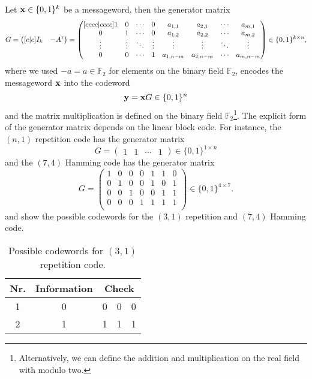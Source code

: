Let $\vb{x}\in\{0,1\}^k$ be a messageword, then the generator matrix
\begin{equation}
	G
	=
	\begin{pmatrix}[c|c]
		I_k & -A^{\scriptscriptstyle\mathsf{T}}
	\end{pmatrix}
	=
	\begin{pmatrix}[cccc|cccc]
		1 & 0 & \cdots & 0 & a_{1,1} & a_{2,1} & \cdots & a_{m,1} \\
		0 & 1 & \cdots & 0 & a_{1,2} & a_{2,2} & \cdots & a_{m,2}\\
		\vdots & \vdots  & \ddots & \vdots & \vdots & \vdots & \ddots & \vdots \\
		0 & 0 & \cdots & 1 & a_{1,n-m} & a_{2,n-m} & \cdots & a_{m,n-m} \\
	\end{pmatrix}
	\in\{0,1\}^{k\times n}
	,
\end{equation}
where we used $-a=a\in\mathbb{F}_2$ for elements on the binary field $\mathbb{F}_2$, encodes the messageword $\vb{x}$ into the codeword
\begin{equation}
	\vb{y}
	=
	\vb{x}G
	\in\{0,1\}^n
\end{equation}
and the matrix multiplication is defined on the binary field $\mathbb{F}_2$\footnote{Alternatively, we can define the addition and multiplication on the real field with modulo two.}.
The explicit form of the generator matrix depends on the linear block code.
For instance, the $(n,1)$ repetition code has the generator matrix
\begin{equation}
	G
	=
	\begin{pmatrix}
		1 & 1 & \cdots & 1
	\end{pmatrix}
	\in\{0,1\}^{1\times n}
\end{equation}
and the $(7,4)$ Hamming code has the generator matrix
\begin{equation}
	G
	=
	\begin{pmatrix}
		1 & 0 & 0 & 0 & 1 & 1 & 0 \\
		0 & 1 & 0 & 0 & 1 & 0 & 1 \\
		0 & 0 & 1 & 0 & 0 & 1 & 1 \\
		0 & 0 & 0 & 1 & 1 & 1 & 1 \\
	\end{pmatrix}
	\in\{0,1\}^{4\times 7}
	.
\end{equation}
 and  show the possible codewords for the $(3,1)$ repetition and $(7,4)$ Hamming code.
\begin{table}[htb]
	\centering
	\begin{tabular}{c|c|ccc}
		\toprule
		Nr. & Information & \multicolumn{3}{c}{Check} \\
		\midrule
			1 & 0 & 0 & 0 & 0 \\
			2 & 1 & 1 & 1 & 1 \\
		\bottomrule
	\end{tabular}
	\caption{Possible codewords for $(3,1)$ repetition code.}\label{tab:repetition_code}
\end{table}

